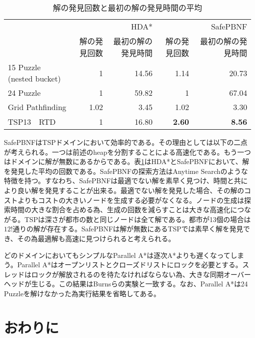 \documentclass[uplatex]{jsarticle}
\begin{document}
\begin{table}[h]
	\centering
	\begin{tabular}{lrrrr} \hline
		 & &             HDA* & & SafePBNF \\ 
		 &  解の発見回数 & 最初の解の発見時間 & 解の発見回数 & 最初の解の発見時間 \\ \hline
		15 Puzzle (nested bucket)& 1 & 14.56 & 1.14 & 20.73 \\ 
		24 Puzzle & 1 & 59.82 & 1 & 67.04 \\ 
		Grid Pathfinding & 1.02 & 3.45 & 1.02 & 3.30 \\ 
		TSP13　RTD & 1 & 16.80 & \textbf{2.60} & \textbf{8.56} \\ \hline
	\end{tabular}
	\caption{解の発見回数と最初の解の発見時間の平均}
	\label{hdastar_incumbent}
\end{table}


SafePBNFはTSPドメインにおいて効率的である。その理由としては以下の二点が考えられる。一つは前述のheapを分割することによる高速化である。もう一つはドメインに解が無数にあるからである。表\ref{hdastar_incumbent}はHDA*とSafePBNFにおいて、解を発見した平均の回数である。SafePBNFの探索方法はAnytime Searchのような特徴を持つ\cite{Burns2010}。すなわち、SafePBNFは最適でない解を素早く見つけ、時間と共により良い解を発見することが出来る。最適でない解を発見した場合、その解のコストよりもコストの大きいノードを生成する必要がなくなる。ノードの生成は探索時間の大きな割合を占める為、生成の回数を減らすことは大きな高速化につながる。TSPは深さが都市の数と同じノードは全て解である。都市が13個の場合は$12!$通りの解が存在する。SafePBNFは解が無数にあるTSPでは素早く解を発見でき、その為最適解も高速に見つけられると考えられる。

どのドメインにおいてもシンプルなParallel A*は逐次A*よりも遅くなってしまう。Parallel A*はオープンリストとクローズドリストにロックを必要とする。スレッドはロックが解放されるのを待たなければならない為、大きな同期オーバーヘッドが生じる。この結果はBurnsらの実験と一致する\cite{Burns2010}。なお、Parallel A*は24 Puzzleを解けなかった為実行結果を省略してある。
\newline

\section{おわりに}
\label{sec:conclusion}
\end{document}
